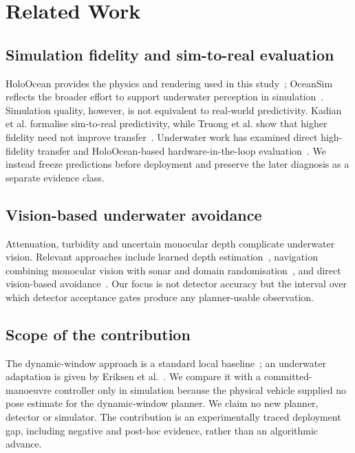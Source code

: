 \section{Related Work}
\label{sec:related}

\subsection{Simulation fidelity and sim-to-real evaluation}

HoloOcean provides the physics and rendering used in this
study~\cite{potokar2022holoocea,potokar2024holoocea}; OceanSim reflects
the broader effort to support underwater perception in
simulation~\cite{song2025oceansim}. Simulation quality, however, is not
equivalent to real-world predictivity. Kadian et al. formalise
sim-to-real predictivity, while Truong et al. show that higher fidelity
need not improve transfer~\cite{kadian2020simrealp,truong2022rethinki}.
Underwater work has examined direct high-fidelity transfer and
HoloOcean-based hardware-in-the-loop
evaluation~\cite{zhang2025simtoreal,meyers2025testinga}. We instead
freeze predictions before deployment and preserve the later diagnosis as
a separate evidence class.

\subsection{Vision-based underwater avoidance}

Attenuation, turbidity and uncertain monocular depth complicate underwater
vision. Relevant approaches include learned depth
estimation~\cite{yu2023udepthfa}, navigation combining monocular vision
with sonar and domain randomisation~\cite{yang2022monocula}, and direct vision-based
avoidance~\cite{drewsjr2016realtime,bergantin2024realtime,yao2023visionba}.
Our focus is not detector accuracy but the interval over which detector
acceptance gates produce any planner-usable observation.

\subsection{Scope of the contribution}

The dynamic-window approach is a standard local
baseline~\cite{fox1997thedynam}; an underwater adaptation is given by
Eriksen et al.~\cite{eriksen2016amodifie}. We compare it with a
committed-manoeuvre controller only in simulation because the physical
vehicle supplied no pose estimate for the dynamic-window planner. We
claim no new planner, detector or simulator. The contribution is an
experimentally traced deployment gap, including negative and post-hoc
evidence, rather than an algorithmic advance.

